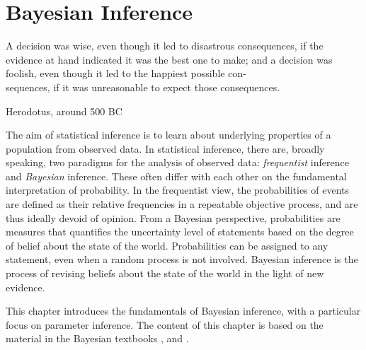 \chapter{Bayesian Inference}\label{chap:bayesian}

\epigraph{A decision was wise, even though it led to disastrous consequences, if the evidence at hand indicated it was the best one to make; and a decision was foolish, even though it led to the happiest possible con-\\sequences, if it was unreasonable to expect those consequences.}{Herodotus, around 500 BC}


The aim of statistical inference is to learn about underlying properties of a population from observed data.  In statistical inference, there are, broadly speaking, two paradigms for the analysis of observed data: \textit{frequentist} inference and \textit{Bayesian} inference. These often differ with each other on the fundamental interpretation of probability. In the frequentist view, the probabilities of events are defined as their relative frequencies in a repeatable objective process, and are thus ideally devoid of opinion. From a Bayesian perspective, probabilities are measures that quantifies the uncertainty level of statements based on the degree of belief about the state of the world. Probabilities can be assigned to any statement, even when a random process is not involved. Bayesian inference is the process of revising beliefs about the state of the world in the light of new evidence.     



This chapter introduces the fundamentals of Bayesian inference, with a particular focus on parameter inference. The content of this chapter is based on the material in the Bayesian textbooks \cite{BDA}, \cite{BAP} and \cite{Sivia}.


